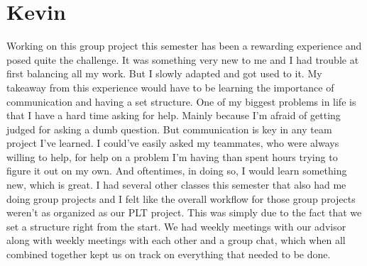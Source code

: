 \section{Kevin}
Working on this group project this semester has been a rewarding experience and posed quite the challenge. It was something very new to me and I had trouble at first balancing all my work. But I slowly adapted and got used to it.
My takeaway from this experience would have to be learning the importance of communication and having a set structure. One of my biggest problems in life is that I have a hard time asking for help.
Mainly because I'm afraid of getting judged for asking a dumb question. But communication is key in any team project I've learned. I could've easily asked my teammates, who were always willing to help, for help on a problem I'm having than spent hours trying to figure it out on my own. And oftentimes, in doing so, I would learn something new, which is great.
I had several other classes this semester that also had me doing group projects and I felt like the overall workflow for those group projects weren't as organized as our PLT project. This was simply due to the fact that we set a structure right from the start. We had weekly meetings with our advisor along with weekly meetings with each other and a group chat, which when all combined together kept us on track on everything that needed to be done.
